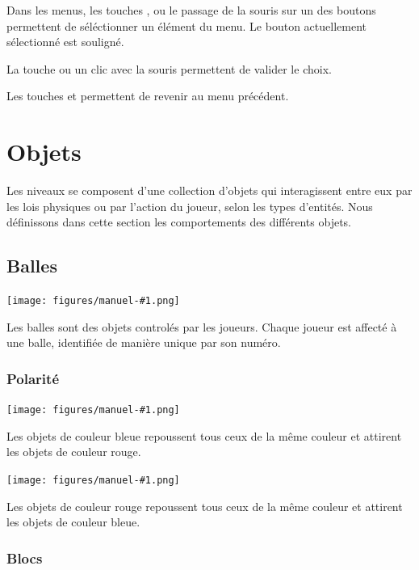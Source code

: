 Dans les menus, les touches \fbox{$\uparrow$}, \fbox{$\downarrow$} ou
le passage de la souris sur un des boutons permettent de séléctionner un
élément du menu. Le bouton actuellement sélectionné est souligné.

La touche  ou un clic avec la souris permettent de valider le choix.

Les touches \fbox{$\longleftarrow$} et  permettent de revenir
au menu précédent.

\section{Objets}
\label{sec:manuel-objets}
\newcommand{\objectsymbol}[1]{
    \texttt{[image: figures/manuel-\#1.png]}
}

\newcommand{\describeobject}[2]{
    \noindent
    \begin{minipage}{.08\textwidth}
        \objectsymbol{#1}
    \end{minipage}
    \begin{minipage}{.9\textwidth}
        #2
    \end{minipage}
}

Les niveaux se composent d'une collection d'objets qui
interagissent entre eux par les lois physiques ou par
l'action du joueur, selon les types d'entités. Nous
définissons dans cette section les comportements
des différents objets.

\subsection{Balles}

\describeobject{ball}{
    Les balles sont des objets controlés par les joueurs. Chaque joueur
    est affecté à une balle, identifiée de manière unique par son numéro.
}

\subsubsection{Polarité}

\describeobject{charge-neg}{
    Les objets de couleur bleue repoussent tous ceux de la même couleur
    et attirent les objets de couleur rouge.
}

\describeobject{charge-pos}{
    Les objets de couleur rouge repoussent tous ceux de la même couleur
    et attirent les objets de couleur bleue.
}

\subsubsection{Blocs}

